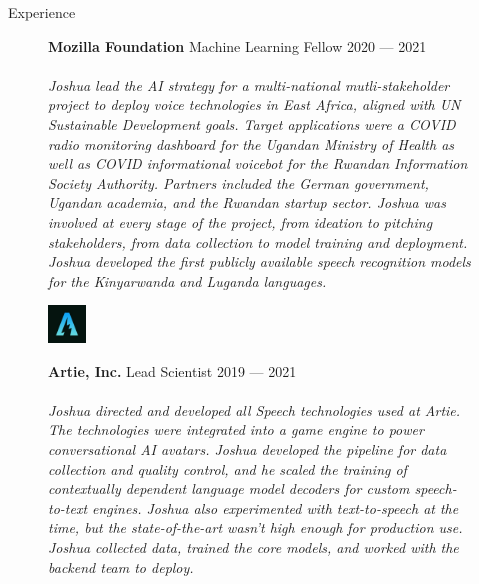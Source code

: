 \documentclass{cv} %
\begin{document}
\begin{rSection}{Experience}
  \begin{figure}[H]
    \begin{minipage}{0.2\textwidth}
      \centering
      
    \end{minipage}
    \begin{minipage}{0.8\textwidth}
      {\bf Mozilla Foundation} \hfill Machine Learning Fellow \hspace{0.5cm} {2020 --- 2021} \\ \\
      \textit{Joshua lead the AI strategy for a multi-national mutli-stakeholder project to deploy voice technologies in East Africa, aligned with UN Sustainable Development goals. Target applications were a COVID radio monitoring dashboard for the Ugandan Ministry of Health as well as COVID informational voicebot for the Rwandan Information Society Authority. Partners included the German government, Ugandan academia, and the Rwandan startup sector. Joshua was involved at every stage of the project, from ideation to pitching stakeholders, from data collection to model training and deployment. Joshua developed the first publicly available speech recognition models for the Kinyarwanda and Luganda languages.} \\
    \end{minipage}
  \end{figure}

  \begin{figure}[H]
    \begin{minipage}{0.2\textwidth}
      \centering
      \includegraphics[width=1cm]{imgs/artie-logo-small.jpeg}
    \end{minipage}
    \begin{minipage}{0.8\textwidth}
      {\bf Artie, Inc.} \hfill Lead Scientist \hspace{0.5cm} {2019 --- 2021} \\ \\
      \textit{Joshua directed and developed all Speech technologies used at Artie. The technologies were integrated into a game engine to power conversational AI avatars. Joshua developed the pipeline for data collection and quality control, and he scaled the training of contextually dependent language model decoders for custom speech-to-text engines. Joshua also experimented with text-to-speech at the time, but the state-of-the-art wasn't high enough for production use. Joshua collected data, trained the core models, and worked with the backend team to deploy.} \\
    \end{minipage}
  \end{figure}


\end{rSection}
\end{document}
